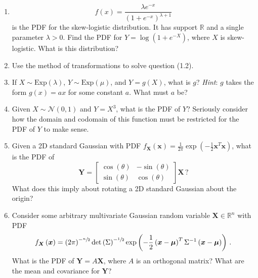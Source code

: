 \documentclass{article}
\begin{document}
\begin{enumerate}
    \item \begin{equation*}
        f\left(x\right) = \frac{\lambda e^{-x}}{\left(1+e^{-x}\right)^{\lambda+1}}
    \end{equation*}
    is the PDF for the skew-logistic distribution. It has support \(\mathbb{R}\) and a single parameter \(\lambda > 0\). Find the PDF for \(Y = \log\left(1 + e^{-X}\right)\), where \(X\) is skew-logistic. What is this distribution?
    \item Use the method of transformations to solve question (1.2).
    \item If \(X\sim\mathrm{Exp}\left(\lambda\right)\), \(Y\sim\mathrm{Exp}\left(\mu\right)\), and \(Y = g\left(X\right)\), what is \(g\)? \textit{Hint}: \(g\) takes the form \(g\left(x\right) = ax\) for some constant \(a\). What must \(a\) be?
    \item Given \(X\sim\mathcal{N}\left(0,1\right)\) and \(Y = X^3\), what is the PDF of \(Y\)? Seriously consider how the domain and codomain of this function must be restricted for the PDF of \(Y\) to make sense.
    \item Given a 2D standard Gaussian with PDF \(f_{\bm{X}}\left(\bm{x}\right) = \frac{1}{2\pi}\exp\left(-\frac{1}{2}\bm{x}^T\bm{x}\right)\), what is the PDF of
    \begin{equation*}
        \bm{Y} = \begin{bmatrix}\cos\left(\theta\right) & -\sin\left(\theta\right)\\\sin\left(\theta\right) & \cos\left(\theta\right)\end{bmatrix}\bm{X}\,?
    \end{equation*}
    What does this imply about rotating a 2D standard Gaussian about the origin?
    \item Consider some arbitrary multivariate Gaussian random variable \(\bm{X}\in\mathbb{R}^n\) with PDF
    \begin{equation*}
        f_{\bm{X}}\left(\bm{x}\right) = \left(2\pi\right)^{-\sfrac{n}{2}}\det\left(\Sigma\right)^{-\sfrac{1}{2}}\exp\left(-\frac{1}{2}\left(\bm{x} - \bm{\mu}\right)^T\Sigma^{-1}\left(\bm{x} - \bm{\mu}\right)\right)\,.
    \end{equation*}
    What is the PDF of \(\bm{Y} = A\bm{X}\), where \(A\) is an orthogonal matrix? What are the mean and covariance for \(\bm{Y}\)?
\end{enumerate}
\end{document}
